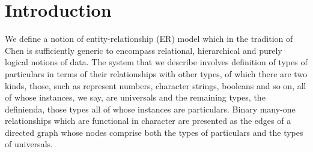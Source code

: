  \section{Introduction}

We  define a notion of entity-relationship (ER) model which in the tradition of Chen\cite{Chen1976} is sufficiently generic to encompass relational, hierarchical and purely logical  notions of data.
The system that we describe involves definition of types of particulars in terms of their relationships with other types, of which there are two kinds, those, such as represent numbers, character strings, booleans and so on, all of whose instances, we say, are universals and the remaining types, the definienda, those types all of whose instances are particulars. Binary many-one relationships which are functional in character are presented as the edges of a directed graph whose nodes comprise both the types of particulars and the types of universals. 

